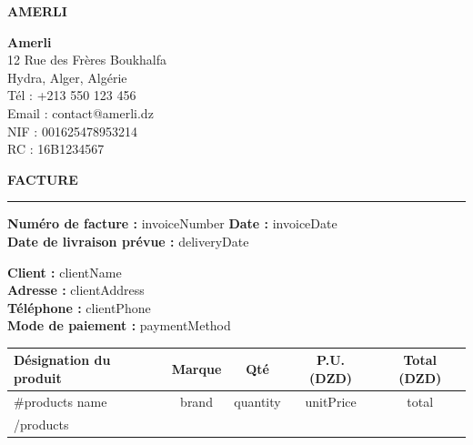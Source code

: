 \documentclass[12pt,a4paper]{article}
\begin{document}
\noindent
\begin{minipage}{0.6\textwidth}
    \textbf{\Large AMERLI}
\end{minipage}
\hfill
\begin{minipage}{0.35\textwidth}\raggedleft
    \textbf{Amerli}\\
    12 Rue des Frères Boukhalfa\\
    Hydra, Alger, Algérie\\
    Tél : +213 550 123 456\\
    Email : contact@amerli.dz\\
    NIF : 001625478953214\\
    RC : 16B1234567
\end{minipage}

\vspace{1cm}

\begin{center}
    {\LARGE \textbf{FACTURE}}\\[0.2cm]
    \rule{0.7\textwidth}{0.4pt}
\end{center}

\vspace{0.3cm}

\noindent
\textbf{Numéro de facture :} {{{invoiceNumber}}} \hfill \textbf{Date :} {{{invoiceDate}}} \\
\textbf{Date de livraison prévue :} {{{deliveryDate}}}

\vspace{0.5cm}

\noindent
\textbf{Client :} {{{clientName}}} \\
\textbf{Adresse :} {{{clientAddress}}} \\
\textbf{Téléphone :} {{{clientPhone}}} \\
\textbf{Mode de paiement :} {{{paymentMethod}}}

\vspace{0.8cm}

\renewcommand{\arraystretch}{1.3}
\begin{table}[H]
\centering
\begin{tabular}{|p{5cm}|c|c|c|c|}
\hline
\textbf{Désignation du produit} & \textbf{Marque} & \textbf{Qté} & \textbf{P.U. (DZD)} & \textbf{Total (DZD)} \\
\hline
{{#products}}
{{{name}}} & {{{brand}}} & {{{quantity}}} & {{{unitPrice}}} & {{{total}}} \\
\hline
{{/products}}
\end{tabular}
\end{table}
\end{document}
